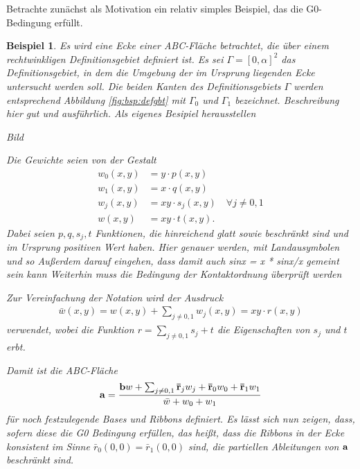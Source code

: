 \documentclass[10pt,a4paper,oneside]{report}
\newtheorem{beispiel}{Beispiel}[chapter]
\begin{document}
Betrachte zunächst als Motivation ein relativ simples Beispiel, das die G0-Bedingung erfüllt.
\begin{beispiel} \label{bsp:G0pos}
Es wird eine Ecke einer ABC-Fläche betrachtet, die über einem rechtwinkligen Definitionsgebiet definiert ist.
Es sei $\Gamma = \left[0,\alpha\right]^2$ das Definitionsgebiet, in dem die Umgebung der im Ursprung liegenden Ecke untersucht werden soll.
Die beiden Kanten des Definitionsgebiets $\Gamma$ werden entsprechend Abbildung \ref{fig:bsp:defgbt} mit $\Gamma_0$ und $\Gamma_1$ bezeichnet.
Beschreibung hier gut und ausführlich. 
Als eigenes Besipiel herausstellen

Bild \label{fig:bsp:defgbt}

Die Gewichte seien von der Gestalt
\begin{align*}
w_0\left(x,y\right) &= y \cdot p\left(x,y\right) \\
w_1\left(x,y\right) &= x \cdot q\left(x,y\right) \\
w_j\left(x,y\right) &= xy \cdot s_j\left(x,y\right) \quad \forall j \neq 0,1 \\
w\left(x,y\right) &= xy \cdot t\left(x,y\right).
\end{align*}
Dabei seien $p, q, s_j, t$ Funktionen, die hinreichend glatt sowie beschränkt sind und im Ursprung positiven Wert haben.
Hier genauer werden, mit Landausymbolen und so
Außerdem darauf eingehen, dass damit auch sinx = x * sinx/x gemeint sein kann
Weiterhin muss die Bedingung der Kontaktordnung überprüft werden

Zur Vereinfachung der Notation wird der Ausdruck
\begin{align*}
\bar{w}\left(x,y\right) = w\left(x,y\right) + \sum_{j \neq 0,1} w_j\left(x,y\right) = xy \cdot r\left(x,y\right)
\end{align*}
verwendet, wobei die Funktion $r = \sum_{j \neq 0,1} s_j + t$ die Eigenschaften von $s_j$ und $t$ erbt.

Damit ist die ABC-Fläche
\begin{align*}
\bold{a} = \frac{\bold{b} w + \sum_{j \neq 0,1} \bold{\bar{r}}_j w_j + \bold{\bar{r}}_0 w_0 + \bold{\bar{r}}_1 w_1}{\bar{w} + w_0 +w_1}
\end{align*}
für noch festzulegende Bases und Ribbons definiert.
Es lässt sich nun zeigen, dass, sofern diese die G0 Bedingung erfüllen, das heißt, dass die Ribbons in der Ecke konsistent im Sinne $\bar{r}_0\left(0,0\right) = \bar{r}_1\left(0,0\right)$ sind, die partiellen Ableitungen von $\bold{a}$ beschränkt sind.


\end{beispiel}
\end{document}
